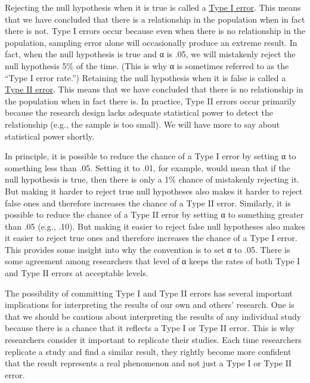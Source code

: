 \documentclass[
]{krantz}
\begin{document}
Rejecting the null hypothesis when it is true is called a \hyperref[type-i-error]{Type I error}. This means that we have concluded that there is a relationship in the population when in fact there is not. Type I errors occur because even when there is no relationship in the population, sampling error alone will occasionally produce an extreme result. In fact, when the null hypothesis is true and α is .05, we will mistakenly reject the null hypothesis 5\% of the time. (This is why α is sometimes referred to as the ``Type I error rate.'') Retaining the null hypothesis when it is false is called a \hyperref[type-ii-error]{Type II error}. This means that we have concluded that there is no relationship in the population when in fact there is. In practice, Type II errors occur primarily because the research design lacks adequate statistical power to detect the relationship (e.g., the sample is too small). We will have more to say about statistical power shortly.

In principle, it is possible to reduce the chance of a Type I error by setting α to something less than .05. Setting it to .01, for example, would mean that if the null hypothesis is true, then there is only a 1\% chance of mistakenly rejecting it. But making it harder to reject true null hypotheses also makes it harder to reject false ones and therefore increases the chance of a Type II error. Similarly, it is possible to reduce the chance of a Type II error by setting α to something greater than .05 (e.g., .10). But making it easier to reject false null hypotheses also makes it easier to reject true ones and therefore increases the chance of a Type I error. This provides some insight into why the convention is to set α to .05. There is some agreement among researchers that level of α keeps the rates of both Type I and Type II errors at acceptable levels.

The possibility of committing Type I and Type II errors has several important implications for interpreting the results of our own and others' research. One is that we should be cautious about interpreting the results of any individual study because there is a chance that it reflects a Type I or Type II error. This is why researchers consider it important to replicate their studies. Each time researchers replicate a study and find a similar result, they rightly become more confident that the result represents a real phenomenon and not just a Type I or Type II error.
\end{document}
